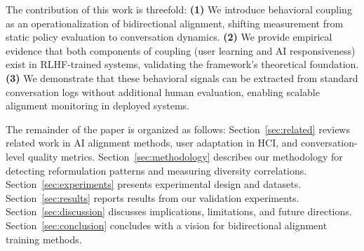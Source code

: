 The contribution of this work is threefold: \textbf{(1)} We introduce behavioral coupling as an operationalization of bidirectional alignment, shifting measurement from static policy evaluation to conversation dynamics. \textbf{(2)} We provide empirical evidence that both components of coupling (user learning and AI responsiveness) exist in RLHF-trained systems, validating the framework's theoretical foundation. \textbf{(3)} We demonstrate that these behavioral signals can be extracted from standard conversation logs without additional human evaluation, enabling scalable alignment monitoring in deployed systems.

The remainder of the paper is organized as follows: Section~\ref{sec:related} reviews related work in AI alignment methods, user adaptation in HCI, and conversation-level quality metrics. Section~\ref{sec:methodology} describes our methodology for detecting reformulation patterns and measuring diversity correlations. Section~\ref{sec:experiments} presents experimental design and datasets. Section~\ref{sec:results} reports results from our validation experiments. Section~\ref{sec:discussion} discusses implications, limitations, and future directions. Section~\ref{sec:conclusion} concludes with a vision for bidirectional alignment training methods.
